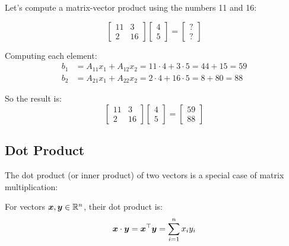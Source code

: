 \begin{example}
Let's compute a matrix-vector product using the numbers 11 and 16:

\begin{equation}
    \begin{bmatrix} 11 & 3 \\ 2 & 16 \end{bmatrix}
    \begin{bmatrix} 4 \\ 5 \end{bmatrix}
    = \begin{bmatrix} ? \\ ? \end{bmatrix}
\end{equation}

Computing each element:
\begin{align}
    b_1 &= A_{11}x_1 + A_{12}x_2 = 11 \cdot 4 + 3 \cdot 5 = 44 + 15 = 59 \\
    b_2 &= A_{21}x_1 + A_{22}x_2 = 2 \cdot 4 + 16 \cdot 5 = 8 + 80 = 88
\end{align}

So the result is:
\begin{equation}
    \begin{bmatrix} 11 & 3 \\ 2 & 16 \end{bmatrix}
    \begin{bmatrix} 4 \\ 5 \end{bmatrix}
    = \begin{bmatrix} 59 \\ 88 \end{bmatrix}
\end{equation}
\end{example}

\subsection{Dot Product}

The dot product (or inner product) of two vectors is a special case of matrix multiplication:

\begin{definition}
For vectors $\boldsymbol{x}, \boldsymbol{y} \in \mathbb{R}^n$, their dot product is:
\begin{equation}
    \boldsymbol{x} \cdot \boldsymbol{y} = \boldsymbol{x}^\top\boldsymbol{y} = \sum_{i=1}^{n} x_i y_i
\end{equation}
\end{definition}

